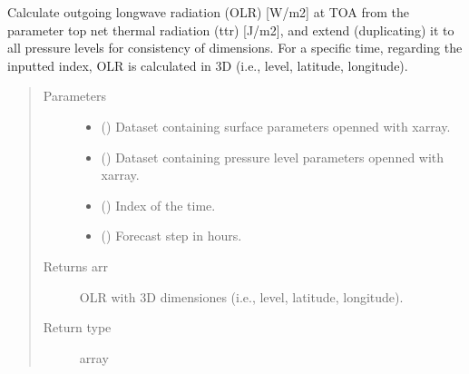 \documentclass[a4paper,11pt,english]{sphinxmanual}
\begin{document}
\label{\detokenize{modules:module-envlib.processing_surf_vars}}

\begin{fulllineitems}
\label{\detokenize{modules:envlib.processing_surf_vars.extend_olr_pl_4d}}
Calculate outgoing longwave radiation (OLR) {[}W/m2{]} at TOA from the parameter top net thermal radiation (ttr)
{[}J/m2{]}, and extend (duplicating) it to all pressure levels for consistency of dimensions. For a specific time, 
regarding the inputted index, OLR is calculated in 3D (i.e., level, latitude, longitude).
\begin{quote}\begin{description}
\item[{Parameters}] \leavevmode\begin{itemize}
\item {} 
 () \textendash{} Dataset containing surface parameters openned with xarray.

\item {} 
 () \textendash{} Dataset containing pressure level parameters openned with xarray.

\item {} 
 () \textendash{} Index of the time.

\item {} 
 () \textendash{} Forecast step in hours.

\end{itemize}

\item[{Returns arr}] \leavevmode
OLR with 3D dimensiones (i.e., level, latitude, longitude).

\item[{Return type}] \leavevmode
array

\end{description}\end{quote}

\end{fulllineitems}
\end{document}
